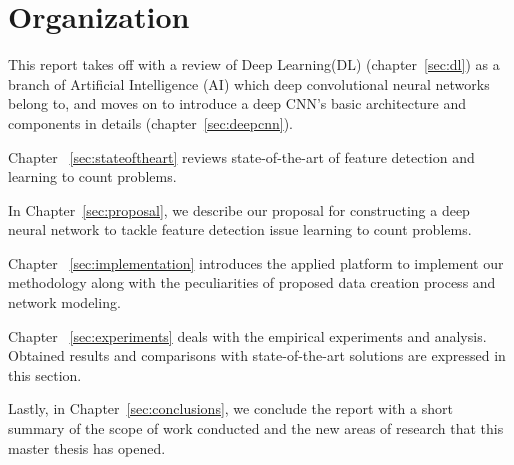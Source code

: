 \begin{enumerate}
\end{enumerate}

\section{Organization}

This report takes off with a review of Deep Learning(DL) (chapter~\ref{sec:dl}) as a branch of Artificial Intelligence (AI) which deep convolutional neural networks belong to, and moves on to introduce a deep CNN's basic architecture and components in details (chapter~\ref{sec:deepcnn}). 


Chapter ~\ref{sec:stateoftheart} reviews state-of-the-art of feature detection and learning to count problems. 

In Chapter~\ref{sec:proposal}, we describe our proposal for constructing a deep neural network to tackle feature detection issue learning to count problems. 

Chapter ~\ref{sec:implementation} introduces the applied platform to implement our methodology  along with the peculiarities of proposed data creation process and network modeling. 

Chapter ~\ref{sec:experiments} deals with the empirical experiments and analysis. Obtained results and comparisons with state-of-the-art solutions are expressed in this section.

Lastly, in Chapter~\ref{sec:conclusions}, we conclude the report with a short summary of the scope of work conducted and the new areas of research that this master thesis has opened.
